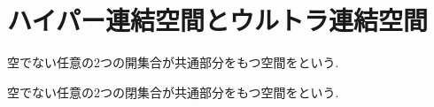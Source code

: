 \documentclass[uplatex, dvipdfmx, a4paper, 12pt, class=jsbook, crop=false]{standalone}
\begin{document}
\section{ハイパー連結空間とウルトラ連結空間}
\label{sec:hyper-connected-and-ultra-connected-spaces}

\begin{definition}
	空でない任意の2つの開集合が共通部分をもつ空間をという.
\end{definition}

\begin{definition}
	空でない任意の2つの閉集合が共通部分をもつ空間をという.
\end{definition}
\end{document}
